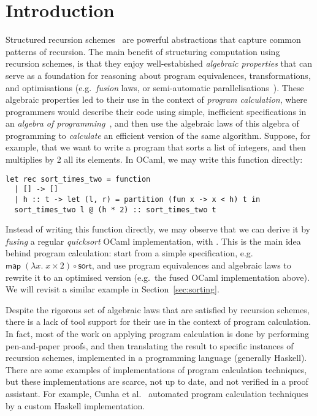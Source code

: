 \documentclass{llncs}
\begin{document}
\section{Introduction}
\label{sec:intro}
Structured recursion schemes~\cite{HinzeW16,HinzeWG15} are powerful
abstractions that capture common patterns of recursion. The main benefit of
structuring computation using recursion schemes, is that they enjoy
well-estabished \emph{algebraic properties} that can serve as a foundation for
reasoning about program equivalences, transformations, and
optimisations (e.g.\ \emph{fusion} laws, or semi-automatic
parallelisations~\cite{TakanoM95,Gibbons96:Third,Morihata09:Third,farmsCastro}).
These algebraic properties led to their use in the context of
\emph{program calculation}, where programmers would describe their code using
simple, inefficient specifications in an \emph{algebra of
programming}~\cite{BirddeMoor96:Algebra}, and then use the algebraic laws of
this algebra of programming to \emph{calculate} an efficient version of the same
algorithm. Suppose, for example, that we want to write a program that sorts a list of
integers, and then multiplies by 2 all its elements. In OCaml, we may write this
function directly:
\begin{verbatim}
let rec sort_times_two = function
  | [] -> []
  | h :: t -> let (l, r) = partition (fun x -> x < h) t in
  sort_times_two l @ (h * 2) :: sort_times_two t
\end{verbatim}
Instead of writing this function directly, we may observe that we can derive it
by \emph{fusing} a regular \emph{quicksort} OCaml implementation, with
. This is the main idea behind program calculation:
start
from a simple specification, e.g.\
$\mathsf{map}\;(\lambda x.\;x \times 2) \circ \mathsf{sort}$, and use program
equivalences and algebraic laws to rewrite it to an optimised version  (e.g.\
the fused OCaml implementation above). We will revisit a similar example
in Section~\ref{sec:sorting}.

Despite the rigorous set of algebraic laws that are satisfied by recursion
schemes, there is a lack of tool support for their use in the context of program
calculation. In fact, most of the work on applying program calculation is done
by performing pen-and-paper proofs, and then translating the result to specific
instances of recursion schemes, implemented in a programming language (generally
Haskell). There are some examples of implementations of program calculation
techniques, but these implementations are scarce, not up to date, and not
verified in a proof assistant. For example, Cunha et al.~\cite{DrHylo} automated
program calculation techniques by a custom Haskell implementation.
\end{document}
